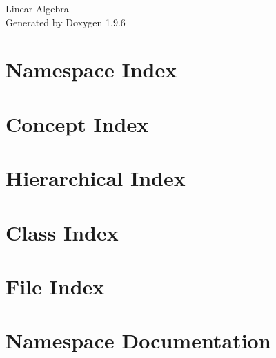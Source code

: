 \documentclass[twoside]{book}
\newcommand{\+}{\discretionary{\mbox{\scriptsize$\hookleftarrow$}}{}{}}
\newcommand{\clearemptydoublepage}{%
    \newpage{\pagestyle{empty}\cleardoublepage}%
  }
\begin{document}
  \raggedbottom
    \hypersetup{pageanchor=false,
                bookmarksnumbered=true,
                pdfencoding=unicode
               }
  \begin{titlepage}
  \vspace*{7cm}
  \begin{center}%
  {\Large Linear Algebra}\\
  \vspace*{1cm}
  {\large Generated by Doxygen 1.9.6}\\
  \end{center}
  \end{titlepage}
  \clearemptydoublepage
  \tableofcontents
  \clearemptydoublepage
  \hypersetup{pageanchor=true}
\chapter{Namespace Index}

\chapter{Concept Index}

\chapter{Hierarchical Index}

\chapter{Class Index}

\chapter{File Index}

\chapter{Namespace Documentation}







\end{document}
